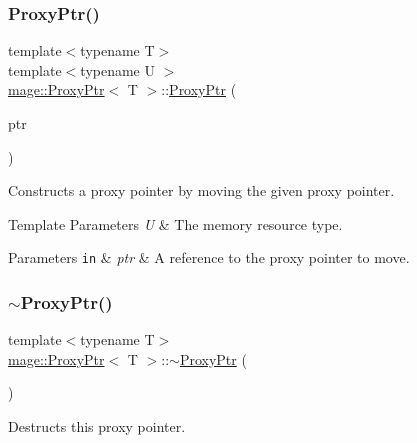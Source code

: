 \subsubsection{\texorpdfstring{Proxy\+Ptr()}{ProxyPtr()}\hspace{0.1cm}{\footnotesize\ttfamily [8/8]}}
{\footnotesize\ttfamily template$<$typename T$>$ \\
template$<$typename U $>$ \\
\hyperlink{classmage_1_1_proxy_ptr}{mage\+::\+Proxy\+Ptr}$<$ T $>$\+::\hyperlink{classmage_1_1_proxy_ptr}{Proxy\+Ptr} (\begin{DoxyParamCaption}\item[{\hyperlink{classmage_1_1_proxy_ptr}{Proxy\+Ptr}$<$ U $>$ \&\&}]{ptr }\end{DoxyParamCaption})\hspace{0.3cm}{\ttfamily [noexcept]}}

Constructs a proxy pointer by moving the given proxy pointer.


\begin{DoxyTemplParams}{Template Parameters}
{\em U} & The memory resource type. \\
\hline
\end{DoxyTemplParams}

\begin{DoxyParams}[1]{Parameters}
\mbox{\tt in}  & {\em ptr} & A reference to the proxy pointer to move. \\
\hline
\end{DoxyParams}
\hypertarget{classmage_1_1_proxy_ptr_a7f8989f9214bbc1cd94295c796cfbb9a}{}\label{classmage_1_1_proxy_ptr_a7f8989f9214bbc1cd94295c796cfbb9a} 
\subsubsection{\texorpdfstring{$\sim$\+Proxy\+Ptr()}{~ProxyPtr()}}
{\footnotesize\ttfamily template$<$typename T$>$ \\
\hyperlink{classmage_1_1_proxy_ptr}{mage\+::\+Proxy\+Ptr}$<$ T $>$\+::$\sim$\hyperlink{classmage_1_1_proxy_ptr}{Proxy\+Ptr} (\begin{DoxyParamCaption}{ }\end{DoxyParamCaption})\hspace{0.3cm}{\ttfamily [default]}}

Destructs this proxy pointer. 


